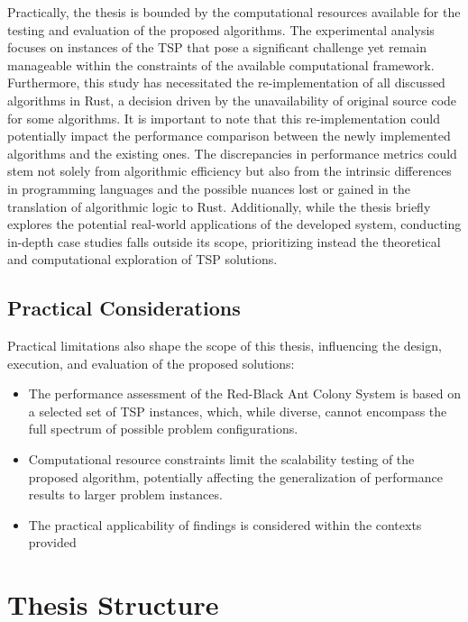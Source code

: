 Practically, the thesis is bounded by the computational resources available for the testing and evaluation of the proposed algorithms. The experimental analysis focuses on instances of the TSP that pose a significant challenge yet remain manageable within the constraints of the available computational framework. Furthermore, this study has necessitated the re-implementation of all discussed algorithms in Rust, a decision driven by the unavailability of original source code for some algorithms. It is important to note that this re-implementation could potentially impact the performance comparison between the newly implemented algorithms and the existing ones. The discrepancies in performance metrics could stem not solely from algorithmic efficiency but also from the intrinsic differences in programming languages and the possible nuances lost or gained in the translation of algorithmic logic to Rust. Additionally, while the thesis briefly explores the potential real-world applications of the developed system, conducting in-depth case studies falls outside its scope, prioritizing instead the theoretical and computational exploration of TSP solutions.

\subsection{Practical Considerations}

Practical limitations also shape the scope of this thesis, influencing the design, execution, and evaluation of the proposed solutions:


\begin{itemize}
    \item The performance assessment of the Red-Black Ant Colony System is based on a selected set of TSP instances, which, while diverse, cannot encompass the full spectrum of possible problem configurations.
    \item Computational resource constraints limit the scalability testing of the proposed algorithm, potentially affecting the generalization of performance results to larger problem instances.
    \item The practical applicability of findings is considered within the contexts provided


\end{itemize}
\section{Thesis Structure}

